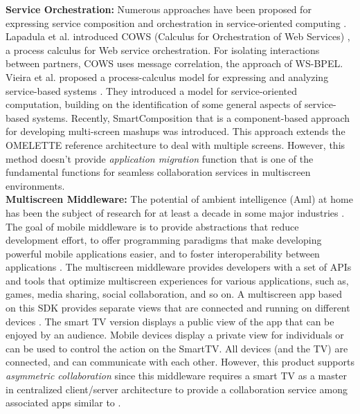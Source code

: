 \documentclass[conference]{IEEEtran}
\begin{document}
\noindent
\textbf{Service Orchestration:}
Numerous approaches have been proposed for expressing service composition and orchestration in service-oriented computing \cite{ehsan2013, Lanese:2007}. 
Lapadula et al. introduced COWS (Calculus for Orchestration of Web Services) \cite{Lapadula:2007}, a process calculus for Web service orchestration. For isolating interactions between partners, COWS uses message correlation, the approach of WS-BPEL.
Vieira et al. proposed a process-calculus model for expressing and analyzing service-based systems \cite{Vieira:2008}.
They introduced a model for service-oriented computation, building on the identification of some general aspects of service-based systems. 
Recently, SmartComposition \cite{MKrug2014} that is a component-based approach for developing multi-screen mashups was introduced. This approach extends the OMELETTE reference architecture to deal with multiple screens. However, this method doesn't provide \textit{application migration} function that is one of the fundamental functions for seamless collaboration services in multiscreen environments.\\

\noindent
\textbf{Multiscreen Middleware:}
The potential of ambient intelligence (Aml) at home has been the subject of research for at least a decade in some major industries \cite{Aarts:2004} .
The goal of mobile middleware is to provide abstractions that reduce development effort, to offer programming paradigms that make developing powerful mobile applications easier, and to foster interoperability between applications \cite{DBLP:FuentesPCM06}.
The multiscreen middleware provides developers with a set of APIs and tools that optimize multiscreen experiences for various applications, such as, games, media sharing, social collaboration, and so on.
A multiscreen app based on this SDK provides separate views that are connected and running on different devices \cite{samsung:2014}. 
The smart TV version displays a public view of the app that can be enjoyed by an audience. 
Mobile devices display a private view for individuals or can be used to control the action on the SmartTV. 
All devices (and the TV) are connected, and can communicate with each other.
However, this product supports  \textit{asymmetric collaboration} since this middleware requires a smart TV as a master in centralized client/server architecture to provide a collaboration service among associated apps similar to \cite{Ma:2008}.\\
\end{document}
